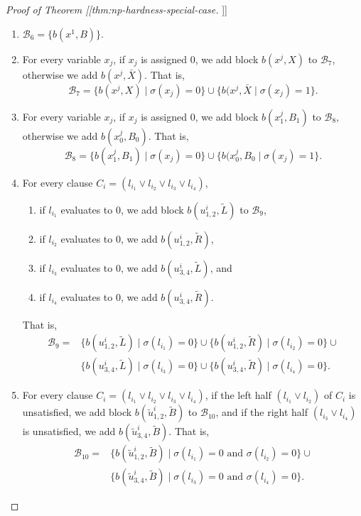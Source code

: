 \documentclass[fontsize=11pt,paper=a4]{book}
\begin{document}
\begin{proof}[Proof of Theorem [[thm:np-hardness-special-case]]]
\begin{enumerate}
\item \(\mathscr{B}_6=\{b(x^1,B)\}\).

\item For every variable \(x_j\), if \(x_j\) is assigned \(0\), we add block \(b(x^j,X)\) to \(\mathscr{B}_7\), otherwise we add \(b(x^j,\bar{X})\).
That is,
\[
   \mathscr{B}_7=\{b(x^j,X)\mid\sigma(x_j)=0\}\cup\{b(x^j,\bar{X}\mid\sigma(x_j)=1\}.
   \]

\item For every variable \(x_j\), if \(x_j\) is assigned \(0\), we add block \(b(x_1^j,B_1)\) to \(\mathscr{B}_8\), otherwise we add \(b(x_0^j,B_0)\).
That is,
\[
   \mathscr{B}_8=\{b(x_1^j,B_1)\mid\sigma(x_j)=0\}\cup\{b(x_0^j,B_0\mid\sigma(x_j)=1\}.
   \]

\item For every clause \(C_i=(l_{i_1}\vee l_{i_2}\vee l_{i_3}\vee l_{i_4})\),

\begin{enumerate}
\item if \(l_{i_1}\) evaluates to \(0\), we add block \(b(u_{1,2}^i,\tilde{L})\) to \(\mathscr{B}_9\),

\item if \(l_{i_2}\) evaluates to \(0\), we add \(b(u_{1,2}^i,\tilde{R})\),

\item if \(l_{i_3}\) evaluates to \(0\), we add \(b(u_{3,4}^i,\tilde{L})\), and

\item if \(l_{i_4}\) evaluates to \(0\), we add \(b(u_{3,4}^i,\tilde{R})\).
\end{enumerate}

That is,
\begin{align*}
\mathscr{B}_9=&\{b(u_{1,2}^i,\tilde{L})\mid\sigma(l_{i_1})=0\}\cup
\{b(u_{1,2}^i,\tilde{R})\mid\sigma(l_{i_2})=0\}\cup\\
&\{b(u_{3,4}^i,\tilde{L})\mid\sigma(l_{i_3})=0\}\cup
\{b(u_{3,4}^i,\tilde{R})\mid\sigma(l_{i_4})=0\}.
\end{align*}

\item For every clause \(C_i=(l_{i_1}\vee l_{i_2}\vee l_{i_3}\vee l_{i_4})\), if the left half \((l_{i_1}\vee l_{i_2})\) of \(C_i\) is unsatisfied, we add block \(b(\tilde{u}_{1,2}^i,\tilde{B})\) to \(\mathscr{B}_{10}\), and if the right half \((l_{i_3}\vee l_{i_4})\) is unsatisfied, we add \(b(\tilde{u}_{3,4}^i,\tilde{B})\).
That is,
\begin{align*}
\mathscr{B}_{10}=&\{b(\tilde{u}_{1,2}^i,\tilde{B})\mid\sigma(l_{i_1})=0\text{ and }\sigma(l_{i_2})=0\}\cup\\
&\{b(\tilde{u}_{3,4}^i,\tilde{B})\mid\sigma(l_{i_3})=0\text{ and }\sigma(l_{i_4})=0\}.
\end{align*}


\end{enumerate}
\end{proof}
\end{document}
